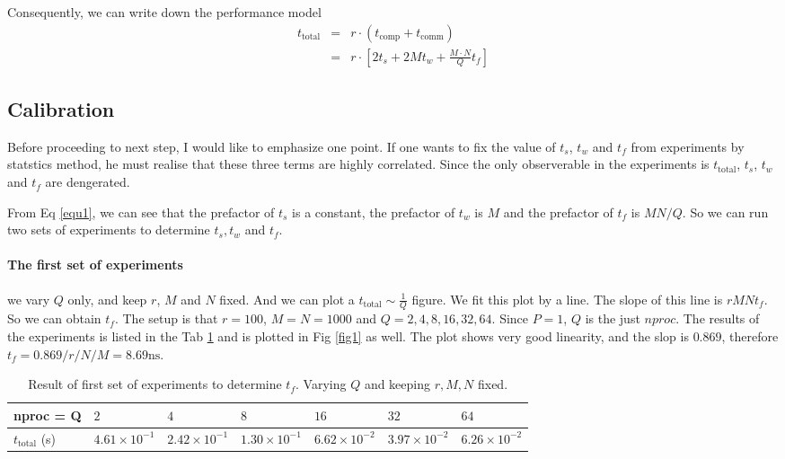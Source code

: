 Consequently, we can write down the performance model 
\begin{eqnarray} 
	t_{\textrm{total}} &=& r \cdot \left( t_{\textrm{comp}} + t_{\textrm{comm}} \right) \\
	&=& r \cdot \left[ 2 t_s + 2 M t_w + \frac{M\cdot N}{Q} t_f \right]	\label{equ1}
\end{eqnarray}

\subsection{Calibration}
Before proceeding to next step, I would like to emphasize one point. 
If one wants to fix the value of $t_s$, $t_w$ and $t_f$ from experiments by statstics method, 
he must realise that these three terms are highly correlated.
Since the only observerable in the experiments is $t_{\textrm{total}}$, $t_s$, $t_w$ and $t_f$ are dengerated.

From Eq \ref{equ1}, we can see that the prefactor of $t_s$ is a constant, the prefactor of $t_w$ is $M$ and the prefactor of $t_f$ is $M N/Q$.
So we can run two sets of experiments to determine $t_s, t_w$ and $t_f$. 
\paragraph{The first set of experiments} we vary $Q$ only, and keep $r$, $M$ and $N$ fixed. And we can plot a $t_{\textrm{total}} \sim \frac{1}{Q}$
figure. We fit this plot by a line. The slope of this line is $r M N t_f$. So we can obtain $t_f$. The setup is that $r=100$, $M=N=1000$ and 
$Q=2,4,8,16,32,64$. Since $P=1$, $Q$ is the just $nproc$. The results of the experiments is listed in the Tab \ref{tab2} and is plotted in 
Fig \ref{fig1} as well. The plot shows very good linearity, and the slop is $0.869$, therefore $t_f = 0.869/r/N/M = 8.69 \textrm{ns}$.
\begin{table}[h]
	\centering
	\caption{Result of first set of experiments to determine $t_f$. Varying $Q$ and keeping $r, M, N$ fixed.}
	\label{tab2}
	\begin{tabular}{lllllll}
		\hline
		nproc = Q                & $2$ & $4$ & $8$ & $16$ & $32$ & $64$ \\ \hline
		$t_{\textrm{total}}$ (s) & $4.61\times 10^{-1}$ & $2.42\times 10^{-1}$ & $1.30\times 10^{-1}$ & $6.62\times 10^{-2}$ & $3.97\times 10^{-2}$ & $6.26\times 10^{-2}$ \\ \hline
	\end{tabular}
\end{table}

